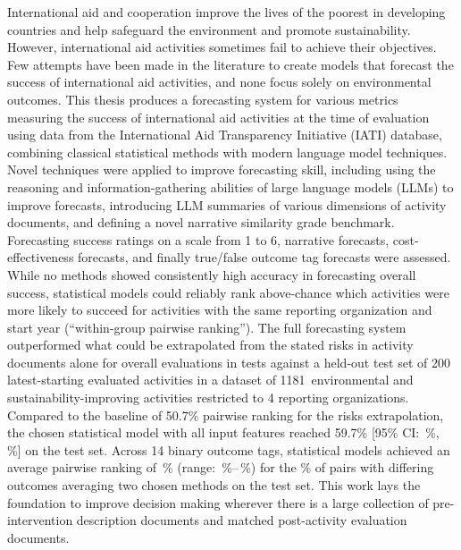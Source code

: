 \documentclass[12pt,a4paper]{article}
\begin{document}

\newcommand{\NOverallRatings}{1181}
\newcommand{\NOutcomeTags}{1176}
\newcommand{\NCostEffectiveness}{533}
\newcommand{\NAiForecasting}{283}


\pgfmathsetmacro{\Rsqdelta}{\Rsqheldoutratingsllmfeatures - \Rsqnollmfrac}
 
International aid and cooperation improve the lives of the poorest in developing countries and help safeguard the environment and promote sustainability. However, international aid activities sometimes fail to achieve their objectives. Few attempts have been made in the literature to create models that forecast the success of international aid activities, and none focus solely on environmental outcomes. This thesis produces a forecasting system for various metrics measuring the success of international aid activities at the time of evaluation using data from the International Aid Transparency Initiative (IATI) database, combining classical statistical methods with modern language model techniques. Novel techniques were applied to improve forecasting skill, including using the reasoning and information-gathering abilities of large language models (LLMs) to improve forecasts, introducing LLM summaries of various dimensions of activity documents, and defining a novel narrative similarity grade benchmark. Forecasting success ratings on a scale from 1 to 6, narrative forecasts, cost-effectiveness forecasts, and finally true/false outcome tag forecasts were assessed. While no methods showed consistently high accuracy in forecasting overall success, statistical models could reliably rank above-chance which activities were more likely to succeed for activities with the same reporting organization and start year (``within-group pairwise ranking''). The full forecasting system outperformed what could be extrapolated from the stated risks in activity documents alone for overall evaluations in tests against a held-out test set of 200 latest-starting evaluated activities in a dataset of \NOverallRatings\ environmental and sustainability-improving activities restricted to 4 reporting organizations. Compared to the baseline of 50.7\% pairwise ranking for the risks extrapolation, the chosen statistical model with all input features reached 59.7\% [95\% CI: \PairwiseCILow\,\%, \PairwiseCIHigh\,\%] on the test set. Across 14 binary outcome tags, statistical models achieved an average pairwise ranking of \OutcomeTagPairwiseAvg\,\% (range: \OutcomeTagPairwiseMin\,\%--\OutcomeTagPairwiseMax\,\%) for the \DifferingOutcomePairsFrac\% of pairs with differing outcomes averaging two chosen methods on the test set. This work lays the foundation to improve decision making wherever there is a large collection of pre-intervention description documents and matched post-activity evaluation documents.
\end{document}
